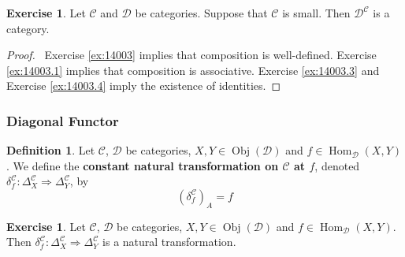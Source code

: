 \documentclass[12pt]{amsart}
\theoremstyle{definition}
\newtheorem{defn}[definition]{Definition}
\newtheorem{ex}[definition]{Exercise}
\newcommand{\del}{\delta}
\newcommand{\Del}{\Delta}
\newcommand{\MC}{\mathcal{C}}
\newcommand{\MD}{\mathcal{D}}
\DeclareMathOperator{\Obj}{Obj}
\DeclareMathOperator{\Hom}{Hom}
\DeclareMathOperator*{\0}{\mbf{0}}
\DeclareMathOperator*{\1}{\mbf{1}}
\newcommand{\lex}[1]{\label{ex:#1}}
\newcommand{\ld}[1]{\label{defn:#1}}
\newcommand{\rex}[1]{Exercise \ref{ex:#1}}
\begin{document}
	\begin{ex} \lex{14007}
		Let $\MC$ and $\MD$ be categories. Suppose that $\MC$ is small. Then $\MD^{\MC}$ is a category.
	\end{ex}

	\begin{proof}\
		\rex{14003} implies that composition is well-defined. \rex{14003.1} implies that composition is associative. \rex{14003.3} and \rex{14003.4} imply the existence of identities.  
	\end{proof}


	
	
	
	
	
	
	
	\subsubsection{Diagonal Functor}

	\begin{defn} \ld{14008}
		Let $\MC$, $\MD$ be categories, $X, Y \in \Obj(\MD)$ and $f \in \Hom_{\MD}(X, Y)$. We define the \textbf{constant natural transformation on $\MC$ at $f$}, denoted $\del^{\MC}_f: \Del^{\MC}_X \Rightarrow \Del^{\MC}_Y$, by
		$$(\del^{\MC}_f)_A = f$$
	\end{defn}
	
	\begin{ex} \lex{14009}
		Let $\MC$, $\MD$ be categories, $X, Y \in \Obj(\MD)$ and $f \in \Hom_{\MD}(X, Y)$. Then $\del^{\MC}_f: \Del^{\MC}_X \Rightarrow \Del^{\MC}_Y $ is a natural transformation.
	\end{ex}
	
\end{document}
